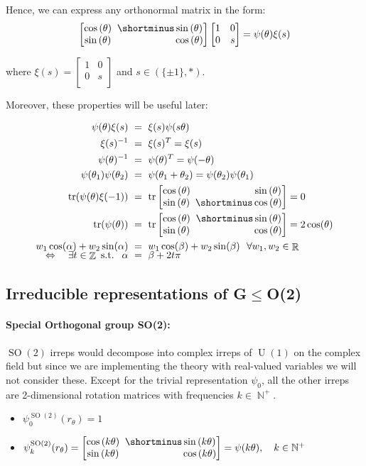 \documentclass{article}
\newcommand{\lp}{\left(}
\newcommand{\rp}{\right)}
\DeclareMathOperator*{\tr}{\operatorname{tr}}
\DeclareMathOperator*{\R}{\mathbb{R}}
\DeclareMathOperator*{\Z}{\mathbb{Z}}
\DeclareMathOperator*{\N}{\mathbb{N}}
\newcommand{\SO}[1]{\ensuremath{\operatorname{SO}(#1)}}
\newcommand{\U}[1]{\ensuremath{\operatorname{U}(#1)}}
\newcommand{\Flip}{(\{\pm 1\}, *)}
\newcommand{\PSI}[1]{
	\begin{bmatrix}
		\cos\lp#1\rp & \!\!\!         \shortminus \sin\lp#1\rp \\
		\sin\lp#1\rp & \!\!\!\phantom{\shortminus}\cos\lp#1\rp \\
	\end{bmatrix}
}
\newcommand{\PSIS}[1]{
	\begin{bmatrix}
		\cos\lp#1\rp & \!\!\!\phantom{\shortminus}\sin\lp#1\rp \\
		\sin\lp#1\rp & \!\!\!         \shortminus \cos\lp#1\rp \\
	\end{bmatrix}
}
\newcommand{\XI}[1]{
	\begin{bmatrix}
		1 & \!\!\! 0 \\
		0 & \!\!\! #1 \\
	\end{bmatrix}
}
\begin{document}
Hence, we can express any orthonormal matrix in the form:
$$\PSI{\theta} \begin{bmatrix}1 & 0 \\ 0 & s \end{bmatrix} = \psi(\theta)\xi(s)$$

where $\xi(s) = \XI{s}$ and $s \in \Flip$.

Moreover, these properties will be useful later:

\begingroup
\addtolength{\jot}{.6em}
\begin{align}
	\label{eq:orthogonal_properties_rotflip_commute}
	\psi(\theta) \xi(s)\ &=\ \xi(s) \psi(s\theta) \\
	\label{eq:orthogonal_properties_flip_inverse}
	\xi(s)^{-1}\ &=\ \xi(s)^T = \xi(s) \\
	\label{eq:orthogonal_properties_rot_inverse}
	\psi(\theta)^{-1}\ &=\ \psi(\theta)^{T} = \psi(-\theta) \\
	\label{eq:orthogonal_properties_rot_sum}
	\psi(\theta_1) \psi(\theta_2)\ &=\ \psi(\theta_1 + \theta_2) = \psi(\theta_2) \psi(\theta_1) \\
	\label{eq:orthogonal_properties_trace_flip}
	\tr(\psi(\theta) \xi(-1))\ &=\ \tr \PSIS{\theta} = 0 \\
	\label{eq:orthogonal_properties_trace_rot}
	\tr(\psi(\theta))\ &=\ \tr \PSI{\theta} = 2 \cos(\theta) \\
	\label{eq:trick_trigonometry}
	w_1 \cos(\alpha) + w_2 \sin(\alpha)\ &=\ w_1 \cos(\beta) + w_2 \sin(\beta) \ \ \forall w_1,w_2\in\R \nonumber \\[-.6em]
		\Leftrightarrow\quad \exists t\in\Z \text{ s.t. }\ \alpha\ &=\ \beta + 2t\pi
\end{align}
\endgroup



\subsection{Irreducible representations of G$\leq$O(2)}
\label{apx:irreps}

\paragraph{Special Orthogonal group SO(2):}
$\SO2$ irreps would decompose into complex irreps of $\U1$ on the complex field but since we are implementing the theory with real-valued variables we will not consider these.
Except for the trivial representation $\psi_0$, all the other irreps are 2-dimensional rotation matrices with frequencies $k\in\N^+$.
\begin{itemize}
\renewcommand\labelitemi{--}
	\item $\psi_0^{\SO2}(r_\theta) = 1 $\\
	\item $\psi_k^{\SO2}(r_\theta) = \PSI{k\theta} = \psi(k\theta),\quad k \in \mathbb{N^+}$
\end{itemize}
\end{document}
